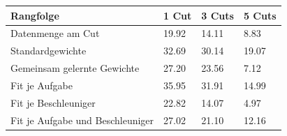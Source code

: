\begin{tabular}{@{}llll@{}}
\toprule
Rangfolge & 1 Cut & 3 Cuts & 5 Cuts \\
\midrule
Datenmenge am Cut & 19.92 & 14.11 & 8.83 \\
Standardgewichte & 32.69 & 30.14 & 19.07 \\
Gemeinsam gelernte Gewichte & 27.20 & 23.56 & 7.12 \\
Fit je Aufgabe & 35.95 & 31.91 & 14.99 \\
Fit je Beschleuniger & 22.82 & 14.07 & 4.97 \\
Fit je Aufgabe und Beschleuniger & 27.02 & 21.10 & 12.16 \\
\bottomrule
\end{tabular}
